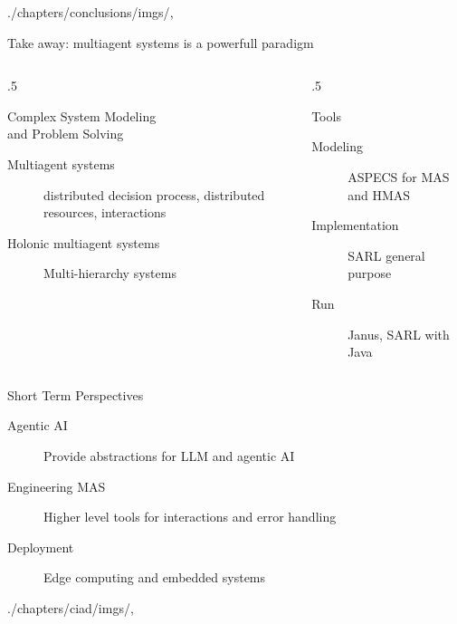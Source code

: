\begin{graphicspathcontext}{{./chapters/conclusions/imgs/},\old}

\begin{frame}{{Take away:} multiagent systems is a powerfull paradigm}
	\begin{columns}
		\begin{column}{.5\linewidth}
			\begin{block}{Complex System Modeling\\and Problem Solving}
				\begin{description}
					\item[Multiagent systems] distributed decision process, distributed resources, interactions
					\item[Holonic multiagent systems] Multi-hierarchy systems
				\end{description}
			\end{block}
		\end{column}
		\begin{column}{.5\linewidth}
			\begin{block}{Tools}
				\begin{description}
					\item[Modeling] ASPECS for MAS and HMAS
					\item[Implementation] SARL general purpose
					\item[Run] Janus, SARL with Java
				\end{description}
			\end{block}
		\end{column}
	\end{columns}
	\vspace{.25cm}
	\begin{block}{Short Term Perspectives \cite{Rodriguez2026}}
		\begin{description}
			\item[Agentic AI] Provide abstractions for LLM and agentic AI
			\item[Engineering MAS] Higher level tools for interactions and error handling
			\item[Deployment] Edge computing and embedded systems
		\end{description}
	\end{block}
\end{frame}

\begin{graphicspathcontext}{{./chapters/ciad/imgs/},\old}


\end{graphicspathcontext}
\end{graphicspathcontext}
